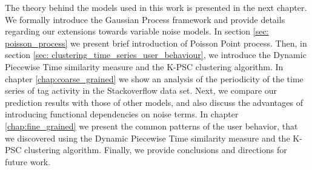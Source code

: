 \documentclass[../thesis.tex]{subfiles}
\begin{document}
The theory behind the models used in this work is presented in the next chapter. We formally 
introduce the Gaussian Process framework and provide details regarding our extensions towards 
variable noise models. In section \ref{sec: poisson_process} we present brief introduction of 
Poisson Point process. Then, in section \ref{sec: clustering_time_series_user_behaviour}, we introduce 
the Dynamic Piecewise Time similarity measure and the K-PSC clustering algorithm. In chapter 
\ref{chap:coarse_grained} we show an analysis of the periodicity of the time series of tag activity 
in the Stackoverflow data set. Next, we compare our prediction results with those of other models, 
and also discuss the advantages of introducing functional dependencies on noise terms. In chapter 
\ref{chap:fine_grained} we present the common patterns of the user behavior, that we discovered 
using the Dynamic Piecewise Time similarity measure and the K-PSC clustering algorithm. Finally, we 
provide conclusions and directions for future work.
\end{document}
